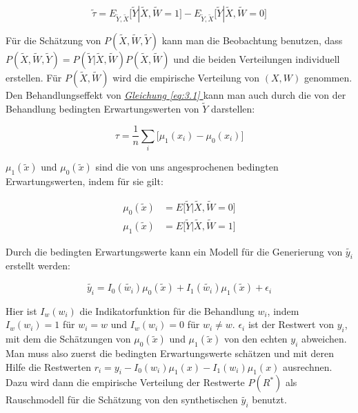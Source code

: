\documentclass[12pt,a4paper,twoside]{scrartcl}
\numberwithin{equation}{section}
\renewcommand*{\refeq}[1]{\emph{\hyperref[#1]{Gleichung \ref*{#1} }}}
\begin{document}
\begin{equation}\label{eq:3.1}
  \tilde{\tau} = E_{\widetilde{Y},\widetilde{X}} \big [\widetilde{Y}|\widetilde{X},\widetilde{W} = 1 \big ] - E_{\widetilde{Y},\widetilde{X}} \big [\widetilde{Y}|\widetilde{X},\widetilde{W} = 0 \big ]
\end{equation} 

\noindent
Für die Schätzung von $P(\widetilde{X},\widetilde{W},\widetilde{Y})$ kann man die Beobachtung benutzen, dass $P(\widetilde{X},\widetilde{W},\widetilde{Y}) = P(\widetilde{Y}|\widetilde{X},\widetilde{W})P(\widetilde{X},\widetilde{W})$ und die beiden Verteilungen individuell erstellen. Für $P(\widetilde{X},\widetilde{W})$ wird die empirische Verteilung von $(X,W)$ genommen. Den Behandlungseffekt von \refeq{eq:3.1} kann man auch durch die von der Behandlung bedingten Erwartungswerten von $\widetilde{Y}$ darstellen\cite{schuler2017synth}:\par 

\begin{equation}\label{eq:3.2}
 \tau = \frac{1}{n}\sum_i \big [\mu_1(x_i)-\mu_0(x_i) \big ]
\end{equation}

\noindent
$\mu_1(\tilde{x})$ und $\mu_0(\tilde{x})$ sind die von uns angesprochenen bedingten Erwartungswerten, indem für sie gilt:

\begin{equation}\label{eq:3.3}
\begin{split}
\mu_0(\tilde{x}) &= E \big [\widetilde{Y}|\widetilde{X},\widetilde{W} = 0 \big ]\\
\mu_1(\tilde{x}) &= E \big [\widetilde{Y}|\widetilde{X},\widetilde{W} = 1 \big ]
\end{split}
\end{equation}

\noindent
Durch die bedingten Erwartungswerte kann ein Modell für die Generierung von $\tilde{y_i}$ erstellt werden:\par

\begin{equation}\label{eq:3.4}
 \tilde{y_i} = I_0(\tilde{w_i})\mu_0(\tilde{x}) + I_1(\tilde{w_i})\mu_1(\tilde{x}) + \epsilon_i
\end{equation}

\noindent
Hier ist $I_w(w_i)$ die Indikatorfunktion für die Behandlung $w_i$, indem $I_w(w_i) = 1$ für $w_i = w$ und $I_w(w_i) = 0$ für $w_i \neq w$. $\epsilon_i$ ist der Restwert von $y_i$, mit dem die Schätzungen von $\mu_0(\tilde{x})$ und $\mu_1(\tilde{x})$ von den echten $y_i$ abweichen. Man muss also zuerst die bedingten Erwartungswerte schätzen und mit deren Hilfe die Restwerten $r_i = y_i - I_0(w_i)\mu_1(x) - I_1(w_i)\mu_1(x)$ ausrechnen. Dazu wird dann die empirische Verteilung der Restwerte $P(R^*)$ als Rauschmodell für die Schätzung von den synthetischen $\tilde{y_i}$ benutzt\cite{schuler2017synth}.\par 
\end{document}
